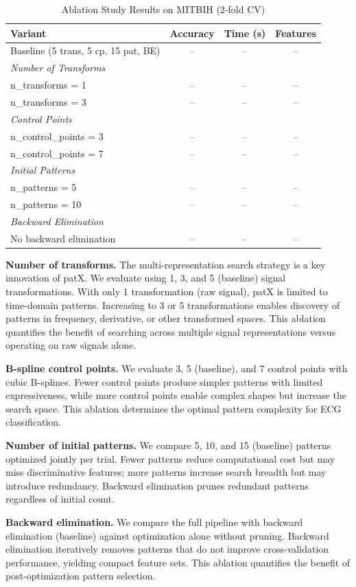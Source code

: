 \documentclass[11pt]{article}
\begin{document}
\begin{table}[H]
\centering
\caption{Ablation Study Results on MITBIH (2-fold CV)}
\label{tab:ablation}
\footnotesize
\begin{tabular}{lccc}
\toprule
\textbf{Variant} & \textbf{Accuracy} & \textbf{Time (s)} & \textbf{Features} \\
\midrule
Baseline (5 trans, 5 cp, 15 pat, BE) & -- & -- & -- \\
\midrule
\multicolumn{4}{l}{\textit{Number of Transforms}} \\
\quad n\_transforms = 1 & -- & -- & -- \\
\quad n\_transforms = 3 & -- & -- & -- \\
\midrule
\multicolumn{4}{l}{\textit{Control Points}} \\
\quad n\_control\_points = 3 & -- & -- & -- \\
\quad n\_control\_points = 7 & -- & -- & -- \\
\midrule
\multicolumn{4}{l}{\textit{Initial Patterns}} \\
\quad n\_patterns = 5 & -- & -- & -- \\
\quad n\_patterns = 10 & -- & -- & -- \\
\midrule
\multicolumn{4}{l}{\textit{Backward Elimination}} \\
\quad No backward elimination & -- & -- & -- \\
\bottomrule
\end{tabular}
\end{table}

\textbf{Number of transforms.}
The multi-representation search strategy is a key innovation of patX.
We evaluate using 1, 3, and 5 (baseline) signal transformations.
With only 1 transformation (raw signal), patX is limited to time-domain patterns.
Increasing to 3 or 5 transformations enables discovery of patterns in frequency,
derivative, or other transformed spaces.
This ablation quantifies the benefit of searching across multiple signal
representations versus operating on raw signals alone.

\textbf{B-spline control points.}
We evaluate 3, 5 (baseline), and 7 control points with cubic B-splines.
Fewer control points produce simpler patterns with limited expressiveness,
while more control points enable complex shapes but increase the search space.
This ablation determines the optimal pattern complexity for ECG classification.

\textbf{Number of initial patterns.}
We compare 5, 10, and 15 (baseline) patterns optimized jointly per trial.
Fewer patterns reduce computational cost but may miss discriminative features;
more patterns increase search breadth but may introduce redundancy.
Backward elimination prunes redundant patterns regardless of initial count.

\textbf{Backward elimination.}
We compare the full pipeline with backward elimination (baseline) against
optimization alone without pruning.
Backward elimination iteratively removes patterns that do not improve
cross-validation performance, yielding compact feature sets.
This ablation quantifies the benefit of post-optimization pattern selection.
\end{document}
